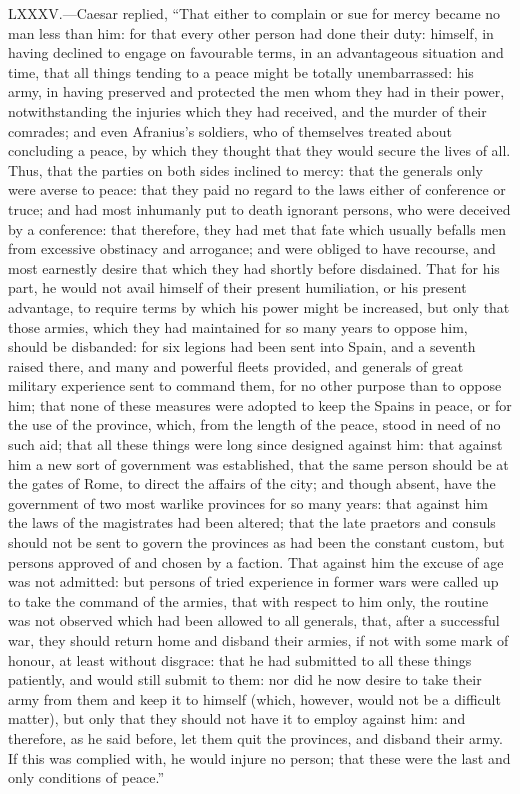 LXXXV.—Caesar replied, ``That either to complain or sue for mercy became
no man less than him: for that every other person had done their duty:
himself, in having declined to engage on favourable terms, in an
advantageous situation and time, that all things tending to a peace
might be totally unembarrassed: his army, in having preserved and
protected the men whom they had in their power, notwithstanding the
injuries which they had received, and the murder of their comrades; and
even Afranius's soldiers, who of themselves treated about concluding a
peace, by which they thought that they would secure the lives of all.
Thus, that the parties on both sides inclined to mercy: that the
generals only were averse to peace: that they paid no regard to the laws
either of conference or truce; and had most inhumanly put to death
ignorant persons, who were deceived by a conference: that therefore,
they had met that fate which usually befalls men from excessive
obstinacy and arrogance; and were obliged to have recourse, and most
earnestly desire that which they had shortly before disdained. That for
his part, he would not avail himself of their present humiliation, or
his present advantage, to require terms by which his power might be
increased, but only that those armies, which they had maintained for so
many years to oppose him, should be disbanded: for six legions had been
sent into Spain, and a seventh raised there, and many and powerful
fleets provided, and generals of great military experience sent to
command them, for no other purpose than to oppose him; that none of
these measures were adopted to keep the Spains in peace, or for the use
of the province, which, from the length of the peace, stood in need of
no such aid; that all these things were long since designed against him:
that against him a new sort of government was established, that the same
person should be at the gates of Rome, to direct the affairs of the
city; and though absent, have the government of two most warlike
provinces for so many years: that against him the laws of the
magistrates had been altered; that the late praetors and consuls should
not be sent to govern the provinces as had been the constant custom, but
persons approved of and chosen by a faction. That against him the excuse
of age was not admitted: but persons of tried experience in former wars
were called up to take the command of the armies, that with respect to
him only, the routine was not observed which had been allowed to all
generals, that, after a successful war, they should return home and
disband their armies, if not with some mark of honour, at least without
disgrace: that he had submitted to all these things patiently, and would
still submit to them: nor did he now desire to take their army from them
and keep it to himself (which, however, would not be a difficult
matter), but only that they should not have it to employ against him:
and therefore, as he said before, let them quit the provinces, and
disband their army. If this was complied with, he would injure no
person; that these were the last and only conditions of peace.''

